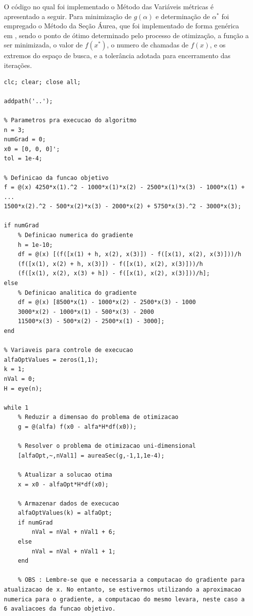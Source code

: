 \documentclass[12pt]{article}
\begin{document}
		O código no qual foi implementado o Método das Variáveis métricas é apresentado a seguir. Para minimização de $ g(\alpha) $ e determinação de $ \alpha^* $ foi empregado o Método da Seção Áurea, que foi implementado de forma genérica em , sendo  o ponto de ótimo determinado pelo processo de otimização,  a função a ser minimizada,  o valor de $ f(x^*) $,  o numero de chamadas de $ f(x) $,  e  os extremos do espaço de busca, e  a tolerância adotada para encerramento das iterações.
		
		\begin{lstlisting}
clc; clear; close all;

addpath('..');

% Parametros pra execucao do algoritmo
n = 3;
numGrad = 0; 
x0 = [0, 0, 0]';
tol = 1e-4;

% Definicao da funcao objetivo
f = @(x) 4250*x(1).^2 - 1000*x(1)*x(2) - 2500*x(1)*x(3) - 1000*x(1) + ...
1500*x(2).^2 - 500*x(2)*x(3) - 2000*x(2) + 5750*x(3).^2 - 3000*x(3);

if numGrad
	% Definicao numerica do gradiente
	h = 1e-10;
	df = @(x) [(f([x(1) + h, x(2), x(3)]) - f([x(1), x(2), x(3)]))/h
	(f([x(1), x(2) + h, x(3)]) - f([x(1), x(2), x(3)]))/h
	(f([x(1), x(2), x(3) + h]) - f([x(1), x(2), x(3)]))/h];
else 
	% Definicao analitica do gradiente
	df = @(x) [8500*x(1) - 1000*x(2) - 2500*x(3) - 1000
	3000*x(2) - 1000*x(1) - 500*x(3) - 2000
	11500*x(3) - 500*x(2) - 2500*x(1) - 3000];
end

% Variaveis para controle de execucao
alfaOptValues = zeros(1,1);
k = 1;
nVal = 0;
H = eye(n);

while 1 
	% Reduzir a dimensao do problema de otimizacao
	g = @(alfa) f(x0 - alfa*H*df(x0));
	
	% Resolver o problema de otimizacao uni-dimensional
	[alfaOpt,~,nVal1] = aureaSec(g,-1,1,1e-4);
	
	% Atualizar a solucao otima
	x = x0 - alfaOpt*H*df(x0);
	
	% Armazenar dados de execucao 
	alfaOptValues(k) = alfaOpt;
	if numGrad 
		nVal = nVal + nVal1 + 6;
	else
		nVal = nVal + nVal1 + 1; 
	end
	
	% OBS : Lembre-se que e necessaria a computacao do gradiente para atualizacao de x. No entanto, se estivermos utilizando a aproximacao numerica para o gradiente, a computacao do mesmo levara, neste caso a 6 avaliacoes da funcao objetivo.
	

\end{lstlisting}
\end{document}
